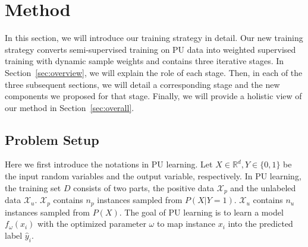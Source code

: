 \documentclass[sigconf]{acmart}
\begin{document}
\section{Method}

In this section, we will introduce our training strategy in detail. Our new training strategy converts semi-supervised training on PU data into weighted supervised training with dynamic sample weights and contains three iterative stages. In Section~\ref{sec:overview}, we will explain the role of each stage. Then, in each of the three subsequent sections, we will detail a corresponding stage and the new components we proposed for that stage. Finally, we will provide a holistic view of our method in Section~\ref{sec:overall}.

\subsection{Problem Setup}
Here we first introduce the notations in PU learning.
Let $X\in \mathbb{R}^d, Y\in\{0,1\}$ be the input random variables and the output variable, respectively. In PU learning, the training set $D$ consists of two parts, the positive data $\mathcal{X}_p$ and the unlabeled data $\mathcal{X}_u$. $\mathcal{X}_p$ contains $n_p$ instances sampled from $P(X|Y=1)$. $\mathcal{X}_u$ contains $n_u$ instances sampled from $P(X)$. The goal of PU learning is to learn a model $f_\omega(x_i)$ with the optimized parameter $\omega$ to map instance $x_i$ into the predicted label $\hat{y}_i$.
\end{document}
